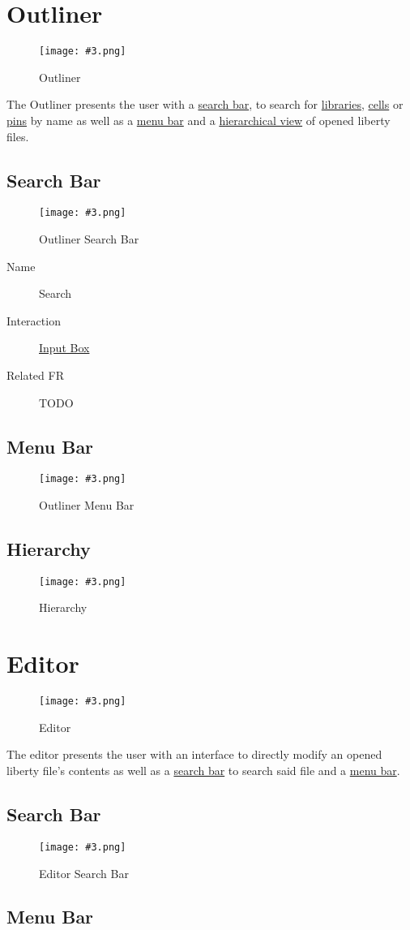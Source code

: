 \documentclass[10pt,a4paper]{report}
\newcommand{\refer}[2]{\hyperref[#1]{\textcolor{col:reference}{#2}}}
\newcommand{\h}[1]{\textcolor{col:highlight}{#1}}
\newcommand{\ui}[3]{
    \begin{description}
        \item[Name]{#1}
        \item[Interaction]{#2}
        \item[Related FR]{#3}
    \end{description}
}
\newcommand{\refg}[2]{\refer{glo:#1}{#2}}
\newcommand{\includeimage}[5]{
    \begin{figure}[H]
        #1
        \texttt{[image: \#3.png]}
        \caption{#4}
        \label{fig:#5}
    \end{figure}
}
\begin{document}
\section{Outliner}
\label{sec:outliner}
\includeimage{}{0.4}{Outliner}{Outliner}{outliner}
The \h{Outliner} presents the user with a \refer{sec:outliner:search}{search bar}, to search for \refg{library}{libraries}, \refg{cell}{cells} or \refg{pin}{pins} by name as well as a \refer{sec:outliner:menu}{menu bar} and a \refer{sec:outliner:hierarchy}{hierarchical view} of opened liberty files.

\subsection{Search Bar}
\label{sec:outliner:search}
\includeimage{}{0.4}{Outliner Search Bar}{Outliner Search Bar}{outliner_search_bar}
\ui{Search}{\refer{it:input_box}{Input Box}}{TODO}

\subsection{Menu Bar}
\label{sec:outliner:menu}

\includeimage{}{0.4}{Outliner Menu Bar}{Outliner Menu Bar}{outliner_menu_bar}

\subsection{Hierarchy}
\label{sec:outliner:hierarchy}

\includeimage{}{0.4}{Hierarchy}{Hierarchy}{hierarchy}

\section{Editor}
\label{sec:editor}
\includeimage{}{0.4}{Editor}{Editor}{editor}
The \h{editor} presents the user with an interface to directly modify an opened liberty file's contents as well as a \refer{sec:editor:search}{search bar} to search said file and a \refer{sec:editor:menu}{menu bar}.

\subsection{Search Bar}
\label{sec:editor:search}

\includeimage{}{0.4}{Editor Search Bar}{Editor Search Bar}{editor_search_bar}

\subsection{Menu Bar}
\label{sec:editor:menu}
\end{document}
